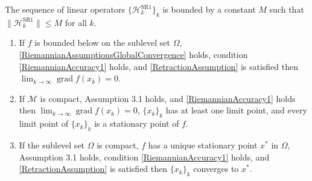 \begin{assumption}\label{RiemannianAssumptionsGlobalConvergence} 
    The sequence of linear operators $\{ \mathcal{H}^{\mathrm{SR1}}_k \}_k$ is bounded by a constant $M$ such that $\lVert \mathcal{H}^{\mathrm{SR1}}_k \rVert \leq M$ for all $k$.
\end{assumption}

\begin{theorem} \label{RiemannianGlobalConvergence}
    \begin{enumerate}
        \item If $f$ is bounded below on the sublevel set $\Omega$, \cref{RiemannianAssumptionsGlobalConvergence} holds, condition \cref{RiemannianAccuracy1} holds, and \cref{RetractionAssumption} is satisfied then $\lim_{k \rightarrow \infty} \operatorname{grad} f(x_k) = 0$.
        \item If $\mathcal{M}$ is compact, Assumption 3.1 holds, and \cref{RiemannianAccuracy1} holds then $\lim_{k \rightarrow \infty} \operatorname{grad} f(x_k) = 0$, $\{ x_k \}_k$ has at least one limit point, and every limit point of $\{ x_k \}_k$ is a stationary point of $f$.
        \item If the sublevel set $\Omega$ is compact, $f$ has a unique stationary point $x^*$ in $\Omega$, Assumption 3.1 holds, condition \cref{RiemannianAccuracy1} holds, and \cref{RetractionAssumption} is satisfied then $\{ x_k \}_k$ converges to $x^*$.
    \end{enumerate}
\end{theorem}




